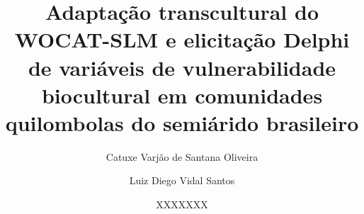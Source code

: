 \documentclass[3p,times]{elsarticle}
\begin{document}
\begin{frontmatter}



\dochead{}

\title{Adaptação transcultural do WOCAT-SLM e elicitação Delphi de variáveis de vulnerabilidade biocultural em comunidades quilombolas do semiárido brasileiro}

\author[a]{Catuxe Varjão de Santana Oliveira}
\author[b]{Luiz Diego Vidal Santos}
\author[a]{XXXXXXX}

\address[a]{Programa de Pós-Graduação em Ciência da Propriedade Intelectual (PPGPI), Universidade Federal de Sergipe (UFS), São Cristóvão, SE, Brasil}
\address[b]{Universidade Estadual de Feira de Santana (UEFS), Feira de Santana, BA, Brasil}


\end{frontmatter}
\end{document}

